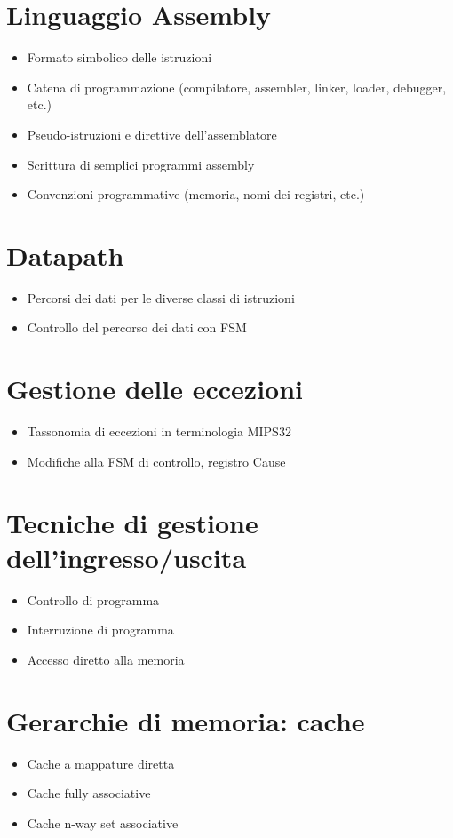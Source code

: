 \documentclass[12pt, a4paper, openany]{book}
\begin{document}
\section{Linguaggio Assembly}
\begin{itemize}
    \item Formato simbolico delle istruzioni
    \item Catena di programmazione (compilatore, assembler, linker, loader, debugger, etc.)
    \item Pseudo-istruzioni e direttive dell'assemblatore
    \item Scrittura di semplici programmi assembly
    \item Convenzioni programmative (memoria, nomi dei registri, etc.)
\end{itemize}

\section{Datapath}
\begin{itemize}
    \item Percorsi dei dati per le diverse classi di istruzioni
    \item Controllo del percorso dei dati con FSM
\end{itemize}

\section{Gestione delle eccezioni}
\begin{itemize}
    \item Tassonomia di eccezioni in terminologia MIPS32
    \item Modifiche alla FSM di controllo, registro Cause
\end{itemize}

\section{Tecniche di gestione dell'ingresso/uscita}
\begin{itemize}
    \item Controllo di programma
    \item Interruzione di programma
    \item Accesso diretto alla memoria
\end{itemize}

\section{Gerarchie di memoria: cache}
\begin{itemize}
    \item Cache a mappature diretta
    \item Cache fully associative
    \item Cache n-way set associative
\end{itemize}
\end{document}
